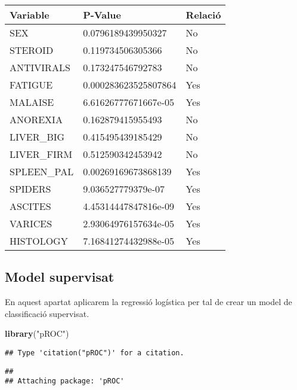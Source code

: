 \documentclass[]{article}
\newenvironment{Shaded}{\begin{snugshade}}{\end{snugshade}}
\newcommand{\KeywordTok}[1]{\textcolor[rgb]{0.13,0.29,0.53}{\textbf{#1}}}
\newcommand{\NormalTok}[1]{#1}
\newcommand{\StringTok}[1]{\textcolor[rgb]{0.31,0.60,0.02}{#1}}
\begin{document}
\begin{table}[H]
\centering
\begin{tabular}{l|l|l}
\hline
Variable & P-Value & Relació\\
\hline
SEX & 0.0796189439950327 & No\\
\hline
STEROID & 0.119734506305366 & No\\
\hline
ANTIVIRALS & 0.173247546792783 & No\\
\hline
FATIGUE & 0.000283623525807864 & Yes\\
\hline
MALAISE & 6.61626777671667e-05 & Yes\\
\hline
ANOREXIA & 0.162879415955493 & No\\
\hline
LIVER\_BIG & 0.415495439185429 & No\\
\hline
LIVER\_FIRM & 0.512590342453942 & No\\
\hline
SPLEEN\_PAL & 0.00269169673868139 & Yes\\
\hline
SPIDERS & 9.036527779379e-07 & Yes\\
\hline
ASCITES & 4.45314447847816e-09 & Yes\\
\hline
VARICES & 2.93064976157634e-05 & Yes\\
\hline
HISTOLOGY & 7.16841274432988e-05 & Yes\\
\hline
\end{tabular}
\end{table}

\hypertarget{model-supervisat}{%
\subsection{Model supervisat}\label{model-supervisat}}

En aquest apartat aplicarem la regressió logística per tal de crear un
model de classificació supervisat.

\begin{Shaded}
\begin{Highlighting}[]
\KeywordTok{library}\NormalTok{(}\StringTok{"pROC"}\NormalTok{)}
\end{Highlighting}
\end{Shaded}

\begin{verbatim}
## Type 'citation("pROC")' for a citation.
\end{verbatim}

\begin{verbatim}
## 
## Attaching package: 'pROC'
\end{verbatim}
\end{document}
